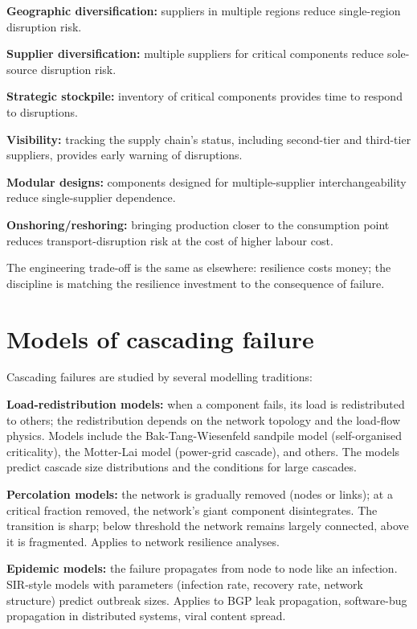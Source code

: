\textbf{Geographic diversification:} suppliers in multiple regions reduce single-region disruption risk.

\textbf{Supplier diversification:} multiple suppliers for critical components reduce sole-source disruption risk.

\textbf{Strategic stockpile:} inventory of critical components provides time to respond to disruptions.

\textbf{Visibility:} tracking the supply chain's status, including second-tier and third-tier suppliers, provides early warning of disruptions.

\textbf{Modular designs:} components designed for multiple-supplier interchangeability reduce single-supplier dependence.

\textbf{Onshoring/reshoring:} bringing production closer to the consumption point reduces transport-disruption risk at the cost of higher labour cost.

The engineering trade-off is the same as elsewhere: resilience costs money; the discipline is matching the resilience investment to the consequence of failure.

\section{Models of cascading failure}

Cascading failures are studied by several modelling traditions:

\textbf{Load-redistribution models:} when a component fails, its load is redistributed to others; the redistribution depends on the network topology and the load-flow physics. Models include the Bak-Tang-Wiesenfeld sandpile model (self-organised criticality), the Motter-Lai model (power-grid cascade), and others. The models predict cascade size distributions and the conditions for large cascades.

\textbf{Percolation models:} the network is gradually removed (nodes or links); at a critical fraction removed, the network's giant component disintegrates. The transition is sharp; below threshold the network remains largely connected, above it is fragmented. Applies to network resilience analyses.

\textbf{Epidemic models:} the failure propagates from node to node like an infection. SIR-style models with parameters (infection rate, recovery rate, network structure) predict outbreak sizes. Applies to BGP leak propagation, software-bug propagation in distributed systems, viral content spread.

